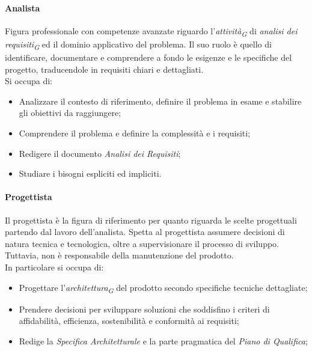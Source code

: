 \paragraph{Analista}\label{analista}Figura professionale con competenze avanzate riguardo l'\textit{attività}\textsubscript{\textit{G}} di \textit{analisi dei requisiti}\textsubscript{\textit{G}} ed il dominio applicativo del problema. Il suo ruolo è quello di identificare, documentare e comprendere a fondo le esigenze e le specifiche del progetto, traducendole in requisiti chiari e dettagliati. \\
Si occupa di:
\begin{itemize}
    \item Analizzare il contesto di riferimento, definire il problema in esame e stabilire gli obiettivi da raggiungere;
    \item Comprendere il problema e definire la complessità e i requisiti;
    \item Redigere il documento \textit{Analisi dei Requisiti};
    \item Studiare i bisogni espliciti ed impliciti.
\end{itemize}

\paragraph{Progettista}\label{progettista}
Il progettista è la figura di riferimento per quanto riguarda le scelte progettuali partendo dal lavoro dell'analista. Spetta al progettista assumere decisioni di natura tecnica e tecnologica, oltre a supervisionare il processo di sviluppo. Tuttavia, non è responsabile della manutenzione del prodotto. \\
In particolare si occupa di:
\begin{itemize}
    \item Progettare l'\textit{architettura}\textsubscript{\textit{G}} del prodotto secondo specifiche tecniche dettagliate;
    \item Prendere decisioni per sviluppare soluzioni che soddisfino i criteri di affidabilità, efficienza, sostenibilità e conformità ai requisiti;
    \item Redige la \textit{Specifica Architetturale} e la parte pragmatica del \textit{Piano di Qualifica};
\end{itemize}

